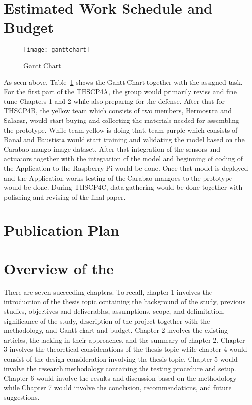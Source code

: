 \ifFinished
\else

\section{Estimated Work Schedule and Budget}

\begin{figure}[!htbp]
	\centering
	\texttt{[image: ganttchart]}
	\caption{Gantt Chart}
	\label{fig:img2}
\end{figure}

As seen above, Table~\ref{fig:img2} shows the Gantt Chart together with the
assigned task. For the first part of the THSCP4A, the group would primarily
revise and fine tune Chapters 1 and 2 while also preparing for the defense.
After that for THSCP4B, the yellow team which consists of two members, Hermosura
and Salazar, would start buying and collecting the materials needed for
assembling the prototype. While team yellow is doing that, team purple which
consists of Banal and Baustista would start training and validating the
 model based on the Carabao mango image dataset. After that integration
of the sensors and actuators together with the integration of the 
model and beginning of coding of the Application to the Raspberry Pi would be
done. Once that  model is deployed and the Application works testing of
the Carabao mangoes to the prototype would be done. During THSCP4C, data
gathering would be done together with polishing and revising of the final paper.

\ifPhD
\section{Publication Plan}
\graytx{\blindtext}
\fi

\fi


\section{Overview of the \documentType}

There are seven succeeding chapters. To recall, chapter 1 involves the
introduction of the thesis topic containing the background of the study,
previous studies, objectives and deliverables, assumptions, scope, and
delimitation, significance of the study, description of the project together
with the methodology, and Gantt chart and budget. Chapter 2 involves the
existing articles, the lacking in their approaches, and the summary of chapter
2. Chapter 3 involves the theoretical considerations of the thesis topic while
chapter 4 would consist of the design consideration involving the thesis topic.
Chapter 5 would involve the research methodology containing the testing
procedure and setup.  Chapter 6 would involve the results and discussion based
on the methodology while Chapter 7 would involve the conclusion,
recommendations, and future suggestions.
